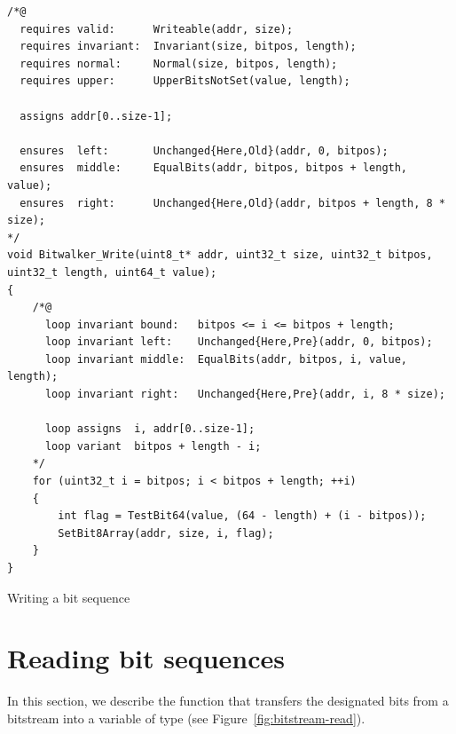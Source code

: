 \begin{listing}[hbt]
\begin{minipage}{0.99\textwidth}
\begin{lstlisting}[style=acsl-block]
/*@
  requires valid:      Writeable(addr, size);
  requires invariant:  Invariant(size, bitpos, length);
  requires normal:     Normal(size, bitpos, length);
  requires upper:      UpperBitsNotSet(value, length);

  assigns addr[0..size-1];

  ensures  left:       Unchanged{Here,Old}(addr, 0, bitpos);
  ensures  middle:     EqualBits(addr, bitpos, bitpos + length, value);
  ensures  right:      Unchanged{Here,Old}(addr, bitpos + length, 8 * size);
*/
void Bitwalker_Write(uint8_t* addr, uint32_t size, uint32_t bitpos, uint32_t length, uint64_t value);
{
    /*@
      loop invariant bound:   bitpos <= i <= bitpos + length;
      loop invariant left:    Unchanged{Here,Pre}(addr, 0, bitpos);
      loop invariant middle:  EqualBits(addr, bitpos, i, value, length);
      loop invariant right:   Unchanged{Here,Pre}(addr, i, 8 * size);

      loop assigns  i, addr[0..size-1];
      loop variant  bitpos + length - i;
    */
    for (uint32_t i = bitpos; i < bitpos + length; ++i)
    {
        int flag = TestBit64(value, (64 - length) + (i - bitpos));
        SetBit8Array(addr, size, i, flag);
    }   
}

\end{lstlisting}
\end{minipage}
\caption{\label{Bitwalker_Write spec}Writing a bit sequence}
\end{listing}

\clearpage

\section{Reading bit sequences}
\label{sec:reading bit sequences}

In this section, we describe the function  that
transfers the designated bits from a bitstream into a variable of type 
(see Figure~\ref{fig:bitstream-read}).


